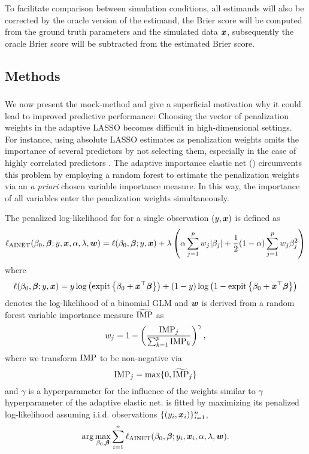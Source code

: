To facilitate comparison between simulation conditions, all estimands will also
be corrected by the oracle version of the estimand, \eg{} the Brier score will
be computed from the ground truth parameters and the simulated data $\text{\boldmath$x$}$,
subsequently the oracle Brier score will be subtracted from the estimated Brier
score.

\subsection{Methods} \label{sec:methods}

\subsubsection{\ainet}
We now present the mock-method and give a superficial motivation why it could
lead to improved predictive performance: Choosing the vector of penalization
weights in the adaptive LASSO becomes difficult in high-dimensional settings.
For instance, using absolute LASSO estimates as penalization weights omits the
importance of several predictors by not selecting them, especially in the case
of highly correlated predictors \citep{Algamal2015}. The adaptive importance
elastic net (\ainet{}) circumvents this problem by employing a random forest to
estimate the penalization weights via an \emph{a priori} chosen variable
importance measure. In this way, the importance of all variables enter the
penalization weights simultaneously.

The penalized log-likelihood for \ainet{} for a single observation $(y, \text{\boldmath$x$})$
is defined as
$$\ell_{\text{AINET}}(\beta_0, \text{\boldmath$\beta$}; y, \text{\boldmath$x$}, \alpha, \lambda, \text{\boldmath$w$}) = 
  \ell(\beta_0, \text{\boldmath$\beta$}; y, \text{\boldmath$x$}) + \lambda\left(\alpha \sum_{j = 1}^p{w_j\lvert\beta_j\rvert} + \frac{1}{2} (1-\alpha) \sum_{j=1}^p{w_j\beta_j^2} \right)$$
where
$$\ell(\beta_0, \text{\boldmath$\beta$}; y, \text{\boldmath$x$}) = 
y \log\left(\operatorname{expit}\left\{\beta_0 + \text{\boldmath$x$}^\top\text{\boldmath$\beta$}\right\}\right) + (1 - y) \log\left(1 - \operatorname{expit}\left\{\beta_0 + \text{\boldmath$x$}^\top\text{\boldmath$\beta$}\right\}\right)$$
denotes the log-likelihood of a binomial GLM and $\text{\boldmath$w$}$ is derived from a
random forest variable importance measure $\widetilde{\operatorname{IMP}}$ as
$$w_j = 1 - \left(\frac{\operatorname{IMP}_j}{\sum_{k=1}^p \operatorname{IMP}_k}\right)^\gamma,$$
where we transform $\operatorname{IMP}$ to be non-negative via
$$\operatorname{IMP}_j = \max\{0, \widetilde{\operatorname{IMP}}_j\}$$
and $\gamma$ is a hyperparameter for the influence of the weights similar to
$\gamma$ hyperparameter of the adaptive elastic net. \ainet{} is fitted by
maximizing its penalized log-likelihood assuming i.i.d. observations
$\{(y_i, \text{\boldmath$x$}_i)\}_{i=1}^n$, \ie
$$\arg\max_{\beta_0, \text{\boldmath$\beta$}} \sum_{i = 1}^n \ell_{\text{AINET}}(\beta_0,
\text{\boldmath$\beta$}; y_i, \text{\boldmath$x$}_i, \alpha, \lambda, \text{\boldmath$w$}).$$

